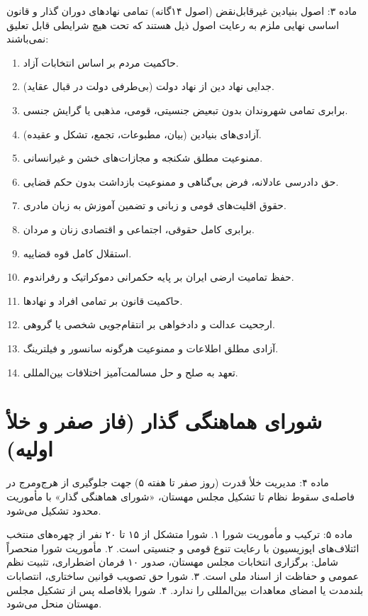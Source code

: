 \documentclass[12pt,a4paper,oneside]{report}
\begin{document}
\begin{articlebox}{ماده ۳: اصول بنیادین غیرقابل‌نقض (اصول ۱۴گانه)}
تمامی نهادهای دوران گذار و قانون اساسی نهایی ملزم به رعایت اصول ذیل هستند که تحت هیچ شرایطی قابل تعلیق نمی‌باشند:
\begin{enumerate}
    \item حاکمیت مردم بر اساس انتخابات آزاد.
    \item جدایی نهاد دین از نهاد دولت (بی‌طرفی دولت در قبال عقاید).
    \item برابری تمامی شهروندان بدون تبعیض جنسیتی، قومی، مذهبی یا گرایش جنسی.
    \item آزادی‌های بنیادین (بیان، مطبوعات، تجمع، تشکل و عقیده).
    \item ممنوعیت مطلق شکنجه و مجازات‌های خشن و غیرانسانی.
    \item حق دادرسی عادلانه، فرض بی‌گناهی و ممنوعیت بازداشت بدون حکم قضایی.
    \item حقوق اقلیت‌های قومی و زبانی و تضمین آموزش به زبان مادری.
    \item برابری کامل حقوقی، اجتماعی و اقتصادی زنان و مردان.
    \item استقلال کامل قوه قضاییه.
    \item حفظ تمامیت ارضی ایران بر پایه حکمرانی دموکراتیک و رفراندوم.
    \item حاکمیت قانون بر تمامی افراد و نهادها.
    \item ارجحیت عدالت و دادخواهی بر انتقام‌جویی شخصی یا گروهی.
    \item آزادی مطلق اطلاعات و ممنوعیت هرگونه سانسور و فیلترینگ.
    \item تعهد به صلح و حل مسالمت‌آمیز اختلافات بین‌المللی.
\end{enumerate}
\end{articlebox}

\chapter{شورای هماهنگی گذار (فاز صفر و خلأ اولیه)}

\begin{articlebox}{ماده ۴: مدیریت خلأ قدرت (روز صفر تا هفته ۵)}
جهت جلوگیری از هرج‌ومرج در فاصله‌ی سقوط نظام تا تشکیل مجلس مهستان، «شورای هماهنگی گذار» با مأموریت محدود تشکیل می‌شود.
\end{articlebox}

\begin{articlebox}{ماده ۵: ترکیب و مأموریت شورا}
۱. شورا متشکل از ۱۵ تا ۲۰ نفر از چهره‌های منتخب ائتلاف‌های اپوزیسیون با رعایت تنوع قومی و جنسیتی است.
۲. مأموریت شورا منحصراً شامل: برگزاری انتخابات مجلس مهستان، صدور ۱۰ فرمان اضطراری، تثبیت نظم عمومی و حفاظت از اسناد ملی است.
۳. شورا حق تصویب قوانین ساختاری، انتصابات بلندمدت یا امضای معاهدات بین‌المللی را ندارد.
۴. شورا بلافاصله پس از تشکیل مجلس مهستان منحل می‌شود.
\end{articlebox}
\end{document}
